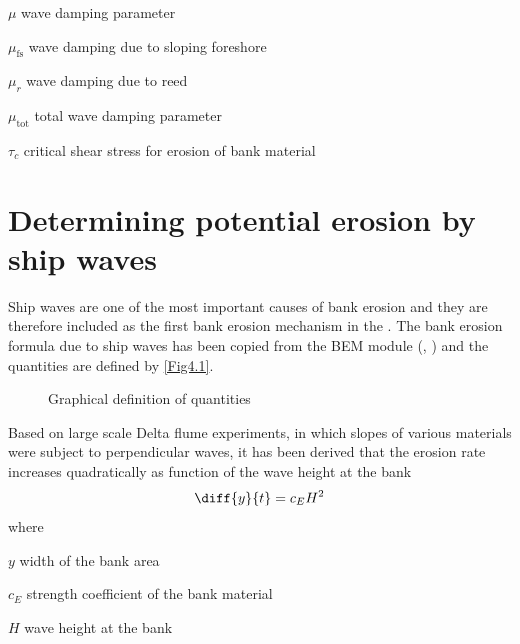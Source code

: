 \begin{symbollist}
\item[$\mu$] wave damping parameter 
\item[$\mu_\text{fs}$] wave damping due to sloping foreshore 
\item[$\mu_r$] wave damping due to reed 
\item[$\mu_\text{tot}$] total wave damping parameter 
\item[$\tau_c$] critical shear stress for erosion of bank material 
\end{symbollist}

\section{Determining potential erosion by ship waves} \label{Sec4.1}

Ship waves are one of the most important causes of bank erosion \citep{Verheij00} and they are therefore included as the first bank erosion mechanism in the \dfastbe.
The bank erosion formula due to ship waves has been copied from the BEM module (\citet{Verheij00}, \citet{StolkerV01b}) and the quantities are defined by \autoref{Fig4.1}.

\begin{figure}[!h]
\center
\resizebox{10cm}{!}{
   
}
\caption{Graphical definition of quantities}
\label{Fig4.1}
\end{figure}

Based on large scale Delta flume experiments, in which slopes of various materials were subject to perpendicular waves, it has been derived that the erosion rate increases quadratically as function of the wave height at the bank
%
\begin{equation}
\diff{y}{t} = c_E H^2
\label{Eq1.1}
\end{equation}
%
where
%
\begin{symbollist}
\item[$y$] width of the bank area 
\item[$c_E$] strength coefficient of the bank material 
\item[$H$] wave height at the bank 
\end{symbollist}

